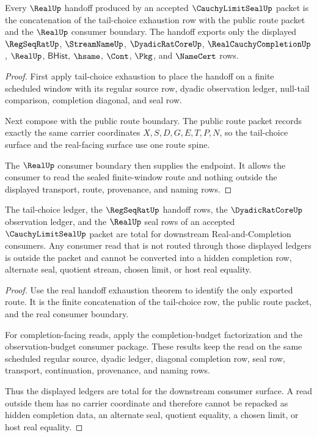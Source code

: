 \begin{theorem}
\label{thm:cauchy-limit-seal-real-handoff-exhaustion}
Every $\RealUp$ handoff produced by an accepted $\CauchyLimitSealUp$ packet is the concatenation of the tail-choice exhaustion row with the public route packet and the $\RealUp$ consumer boundary. The handoff exports only the displayed $\RegSeqRatUp$, $\StreamNameUp$, $\DyadicRatCoreUp$, $\RealCauchyCompletionUp$, $\RealUp$, $\mathsf{BHist}$, $\hsame$, $\Cont$, $\Pkg$, and $\NameCert$ rows.
\end{theorem}
\begin{proof}
First apply tail-choice exhaustion to place the handoff on a finite scheduled window with its regular source row, dyadic observation ledger, null-tail comparison, completion diagonal, and seal row.

Next compose with the public route boundary. The public route packet records exactly the same carrier coordinates $X,S,D,G,E,T,P,N$, so the tail-choice surface and the real-facing surface use one route spine.

The $\RealUp$ consumer boundary then supplies the endpoint. It allows the consumer to read the sealed finite-window route and nothing outside the displayed transport, route, provenance, and naming rows.
\end{proof}

\begin{theorem}
\label{thm:cauchy-limit-seal-ledger-nonescape-totality}
The tail-choice ledger, the $\RegSeqRatUp$ handoff rows, the $\DyadicRatCoreUp$ observation ledger, and the $\RealUp$ seal rows of an accepted $\CauchyLimitSealUp$ packet are total for downstream Real-and-Completion consumers. Any consumer read that is not routed through those displayed ledgers is outside the packet and cannot be converted into a hidden completion row, alternate seal, quotient stream, chosen limit, or host real equality.
\end{theorem}
\begin{proof}
Use the real handoff exhaustion theorem to identify the only exported route. It is the finite concatenation of the tail-choice row, the public route packet, and the real consumer boundary.

For completion-facing reads, apply the completion-budget factorization and the observation-budget consumer package. These results keep the read on the same scheduled regular source, dyadic ledger, diagonal completion row, seal row, transport, continuation, provenance, and naming rows.

Thus the displayed ledgers are total for the downstream consumer surface. A read outside them has no carrier coordinate and therefore cannot be repacked as hidden completion data, an alternate seal, quotient equality, a chosen limit, or host real equality.
\end{proof}

